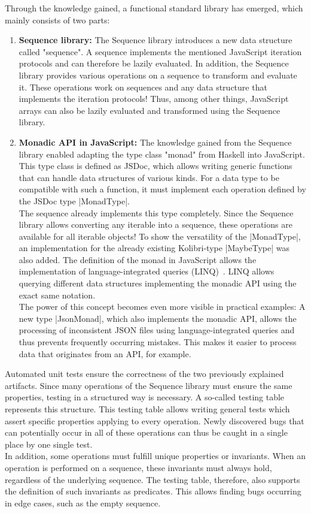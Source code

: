 Through the knowledge gained, a functional standard library has emerged, which
mainly consists of two parts:\\
\begin{enumerate}
  \item \textbf{Sequence library:} The Sequence library introduces a new data
    structure called "sequence". A sequence implements the mentioned JavaScript
    iteration protocols and can therefore be lazily evaluated. In addition, the
    Sequence library provides various operations on a sequence to transform and
    evaluate it. These operations work on sequences and any data structure that
    implements the iteration protocols! Thus, among other things, JavaScript
    arrays can also be lazily evaluated and transformed using the Sequence
    library.
\item \textbf{Monadic API in JavaScript:} The knowledge gained from the
  Sequence library enabled adapting the type class "monad" from Haskell into
  JavaScript. This type class is defined as JSDoc, which allows writing generic
  functions that can handle data structures of various kinds. For a data type
  to be compatible with such a function, it must implement each operation
  defined by the JSDoc type |MonadType|. \\ 
  The sequence already implements this type completely. Since the Sequence
  library allows converting any iterable into a sequence, these operations are
  available for all iterable objects! To show the versatility of the
  |MonadType|, an implementation for the already existing Kolibri-type |MaybeType| was
  also added. The definition of the monad in JavaScript allows the
  implementation of language-integrated queries
  (LINQ)~\cite{billwagner_language-integrated_2023}. LINQ allows querying
  different data structures implementing the monadic API using the exact same
  notation. \\ 
  The power of this concept becomes even more visible in practical examples: A
  new type |JsonMonad|, which also implements the monadic API, allows the
  processing of inconsistent JSON files using language-integrated queries and
  thus prevents frequently occurring mistakes. This makes it easier to process
  data that originates from an API, for example.
\end{enumerate}

Automated unit tests ensure the correctness of the two previously explained
artifacts. Since many operations of the Sequence library must ensure the same
properties, testing in a structured way is necessary. A  so-called testing
table represents this structure. This testing table allows writing general
tests which assert specific properties applying to every operation. Newly
discovered bugs that can potentially occur in all of these operations can thus
be caught in a single place by one single test.\\
In addition, some operations must fulfill unique properties or invariants. When
an operation is performed on a sequence, these invariants must always hold,
regardless of the underlying sequence. The testing table, therefore, also
supports the definition of such invariants as predicates. This allows finding
bugs occurring in edge cases, such as the empty sequence.

